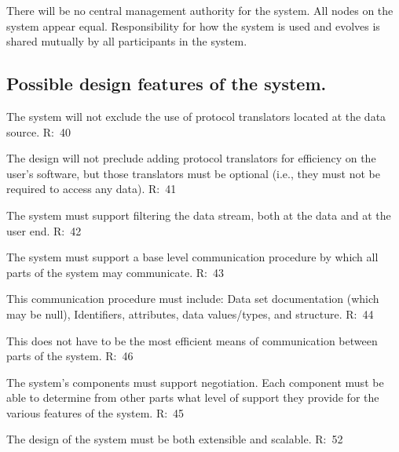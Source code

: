 \begin{list}{}{}
\begin{list}{--}{}
\end{list}

\item There will be no central management authority for the system. All
nodes on the system appear equal. Responsibility for how the system is
used and evolves is shared mutually by all participants in the system.

\subsection {Possible design features of the system.}
\begin{list}{.}{}

\item The system will not exclude the use of protocol translators located at
  the data source.
  R:~40

\item The design will not preclude adding protocol translators for
  efficiency on the user's software, but those translators must be optional
  (i.e., they must not be required to access any data).  R:~41

\item The system must support filtering the data stream, both at the data and
  at the user end.
  R:~42

\item The system must support a base level communication procedure by which
  all parts of the system may communicate.
  R:~43

\begin{list}{--}{}

   \item This communication procedure must include: Data set documentation
    (which may be null), Identifiers, attributes, data values/types, and
    structure.
    R:~44

   \item This does not have to be the most efficient means of communication
    between parts of the system.
    R:~46
 
\end{list}

\item The system's components must support negotiation. Each component
must be able to determine from other parts what level of support they provide
for the various features of the system.  R:~45

\item The design of the system must be both extensible and scalable. R:~52

\end{list}

\end{list}

